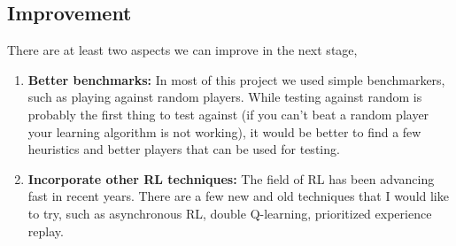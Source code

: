 \documentclass[a4paper]{article}
\begin{document}
\subsection{Improvement}
There are at least two aspects we can improve in the next stage,

\begin{enumerate}

    \item \textbf{Better benchmarks:} In most of this project we used simple benchmarkers, such as playing against random players. While testing against random is probably the first thing to test against (if you can't beat a random player your learning algorithm is not working), it would be better to find a few heuristics and better players that can be used for testing.

    \item \textbf{Incorporate other RL techniques:} The field of RL has been advancing fast in recent years. There are a few new and old techniques that I would like to try, such as asynchronous RL, double Q-learning, prioritized experience replay.

\end{enumerate}







\end{document}
